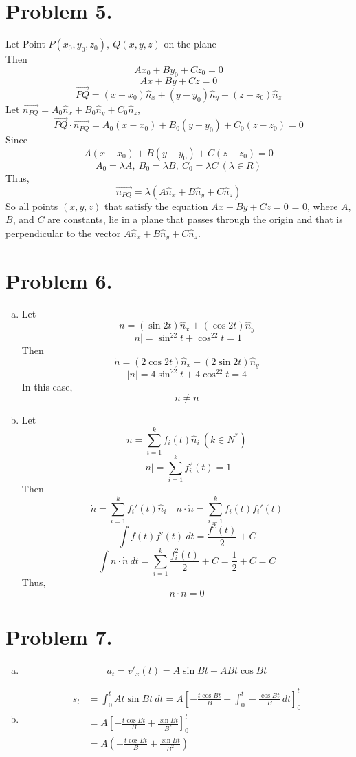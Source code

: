 \documentclass{article}
\begin{document}
\section*{Problem 5.}
Let Point $P(x_0,y_0,z_0),\ Q(x,y,z)$ on the plane\\
Then
$$Ax_0+By_0+Cz_0=0$$
$$Ax+By+Cz=0$$
$$\overrightarrow{PQ}=(x-x_0)\hat{n}_x+(y-y_0)\hat{n}_y+(z-z_0)\hat{n}_z$$
Let $\overrightarrow{n_{PQ}}=A_0\hat{n}_x+B_0\hat{n}_y+C_0\hat{n}_z$, 
$$\overrightarrow{PQ}\cdot\overrightarrow{n_{PQ}}=A_0(x-x_0)+B_0(y-y_0)+C_0(z-z_0)=0$$
Since
$$A(x-x_0)+B(y-y_0)+C(z-z_0)=0$$
$$A_0=\lambda A,\ B_0=\lambda B,\ C_0=\lambda C\ (\lambda\in R)$$
Thus,
$$\overrightarrow{n_{PQ}}=\lambda(A\hat{n}_x+B\hat{n}_y+C\hat{n}_z)$$
So all points $(x,y,z)$ that satisfy the equation $Ax+By+Cz=0$ = 0, where $A$, $B$, and $C$ are constants, lie in a plane that passes through the origin and that is perpendicular to the vector $A\hat{n}_x+B\hat{n}_y+C\hat{n}_z$.

\section*{Problem 6.}
\begin{enumerate}[(a)]
\item
Let
$$n=(\sin 2t)\hat{n}_x+(\cos 2t)\hat{n}_y$$
$$|n|=\sin^22t+\cos^22t=1$$
Then
$$\dot{n}=(2\cos 2t)\hat{n}_x-(2\sin 2t)\hat{n}_y$$
$$|\dot{n}|=4\sin^22t+4\cos^22t=4$$
In this case,
$$n\neq\dot{n}$$
\item
Let
$$n=\sum_{i=1}^kf_i(t)\hat{n}_i\ (k\in N^*)$$
$$|n|=\sum_{i=1}^kf_i^2(t)=1$$
Then
$$\dot{n}=\sum_{i=1}^kf_i'(t)\hat{n}_i \quad n\cdot\dot{n}=\sum_{i=1}^kf_i(t)f_i'(t)$$
$$\int f(t)f'(t)\ dt=\frac{f^2(t)}{2}+C$$
$$\int n\cdot\dot{n}\ dt=\sum_{i=1}^k\frac{f_i^2(t)}{2}+C=\frac{1}{2}+C=C$$
Thus,
$$n\cdot\dot{n}=0$$
\end{enumerate}

\section*{Problem 7.}
\begin{enumerate}[(a)]
\item
$$a_t=v'_x(t)=A\sin Bt+ABt\cos Bt$$
\item
\begin{align*}
s_t&=\int_0^t At\sin Bt\ dt=A\left[-\frac{t\cos Bt}{B}-\int_0^t-\frac{\cos Bt}{B}\ dt\right]_0^t\\
&=A\left[-\frac{t\cos Bt}{B}+\frac{\sin Bt}{B^2}\right]_0^t\\
&=A\left(-\frac{t\cos Bt}{B}+\frac{\sin Bt}{B^2}\right)
\end{align*}
\end{enumerate}
\end{document}
